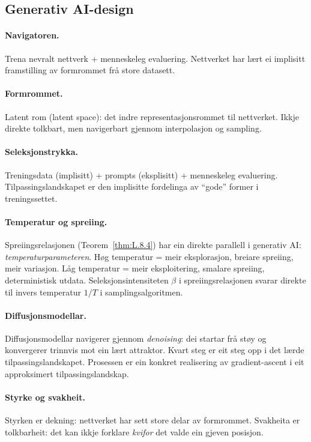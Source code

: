 \subsection{Generativ AI-design}

\paragraph{Navigatoren.}
Trena nevralt nettverk + menneskeleg evaluering. Nettverket har
lært ei implisitt framstilling av formrommet frå store datasett.

\paragraph{Formrommet.}
Latent rom (latent space): det indre representasjonsrommet til
nettverket. Ikkje direkte tolkbart, men navigerbart gjennom
interpolasjon og sampling.

\paragraph{Seleksjonstrykka.}
Treningsdata (implisitt) + prompts (eksplisitt) + menneskeleg
evaluering. Tilpassingslandskapet er den implisitte fordelinga av
``gode'' former i treningssettet.

\paragraph{Temperatur og spreiing.}
Spreiingsrelasjonen (Teorem~\ref{thm:L.8.4}) har ein direkte
parallell i generativ AI: \emph{temperaturparameteren}. Høg
temperatur = meir eksplorasjon, breiare spreiing, meir variasjon.
Låg temperatur = meir eksploitering, smalare spreiing,
deterministisk utdata. Seleksjonsintensiteten $\beta$ i
spreiingsrelasjonen svarar direkte til invers temperatur
$1/T$ i samplingsalgoritmen.

\paragraph{Diffusjonsmodellar.}
Diffusjonsmodellar navigerer gjennom \emph{denoising}: dei
startar frå støy og konvergerer trinnvis mot ein lært attraktor.
Kvart steg er eit steg opp i det lærde tilpassingslandskapet.
Prosessen er ein konkret realisering av gradient-ascent i eit
approksimert tilpassingslandskap.

\paragraph{Styrke og svakheit.}
Styrken er dekning: nettverket har sett store delar av
formrommet. Svakheita er tolkbarheit: det kan ikkje forklare
\emph{kvifor} det valde ein gjeven posisjon.

